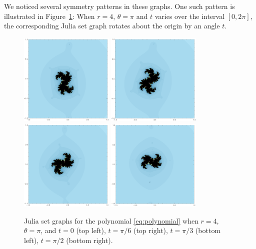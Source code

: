\documentclass[11pt,leqno]{article}
\begin{document}
We noticed several symmetry patterns in these graphs.  One such pattern
is illustrated in \mbox{Figure \ref{fig:rotational-symmetry}}: When $r=4$,
$\theta=\pi$ and $t$ varies over the interval $[0,2\pi]$, the
corresponding Julia set graph rotates about the origin by an angle $t$.

\begin{figure}[H]
\label{fig:rotational-symmetry}
\centering
\includegraphics[width=0.4\textwidth,height=0.3\textwidth]{1.PNG}
\hspace{1em}
\includegraphics[width=0.4\textwidth,height=0.3\textwidth]{2.PNG}
\\
\includegraphics[width=0.4\textwidth,height=0.3\textwidth]{3.PNG}
\hspace{1em}
\includegraphics[width=0.4\textwidth,height=0.3\textwidth]{4.PNG}
\caption{Julia set graphs for the polynomial \eqref{eq:polynomial}
when $r=4$, $\theta=\pi$, and $t=0$ (top left), $t=\pi/6$ (top right), 
$t=\pi/3$ (bottom left), $t=\pi/2$ (bottom right).
}
\end{figure}
\end{document}

